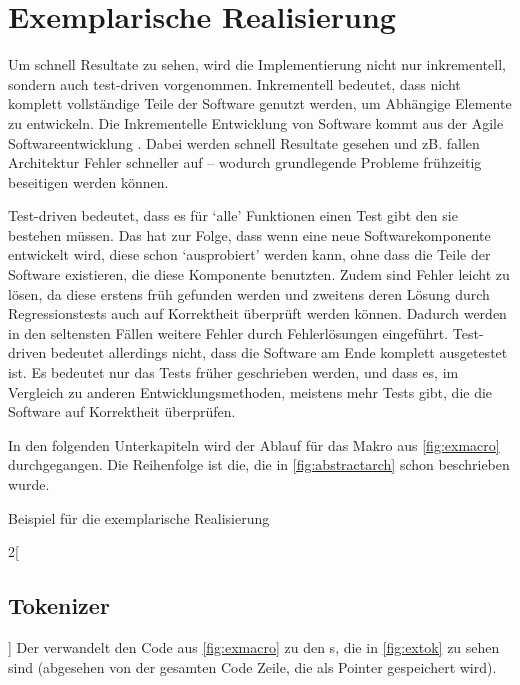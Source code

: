 {%
\section{Exemplarische Realisierung}
\label{sec:Exemplarische Realisierung}
  Um schnell Resultate zu sehen, wird die Implementierung nicht nur inkrementell, sondern auch test-driven \autocite{beck2003test} vorgenommen. Inkrementell bedeutet, dass nicht komplett vollständige Teile der Software genutzt werden, um Abhängige Elemente zu entwickeln. Die Inkrementelle Entwicklung von Software kommt aus der Agile Softwareentwicklung \autocite{cohen2003agile}. Dabei werden schnell Resultate gesehen und zB. fallen Architektur Fehler schneller auf -- wodurch grundlegende Probleme frühzeitig beseitigen werden können.

  Test-driven bedeutet, dass es für `alle' Funktionen einen Test gibt den sie bestehen müssen. Das hat zur Folge, dass wenn eine neue Softwarekomponente entwickelt wird, diese schon `ausprobiert' werden kann, ohne dass die Teile der Software existieren, die diese Komponente benutzten. Zudem sind Fehler leicht zu lösen, da diese erstens früh gefunden werden und zweitens deren Lösung durch Regressionstests auch auf Korrektheit überprüft werden können. Dadurch werden in den seltensten Fällen weitere Fehler durch Fehlerlösungen eingeführt. Test-driven bedeutet allerdings nicht, dass die Software am Ende komplett ausgetestet ist. Es bedeutet nur das Tests früher geschrieben werden, und dass es, im Vergleich zu anderen Entwicklungsmethoden, meistens mehr Tests gibt, die die Software auf Korrektheit überprüfen.

  In den folgenden Unterkapiteln wird der Ablauf für das Makro aus \autoref{fig:exmacro} durchgegangen. Die Reihenfolge ist die, die in \autoref{fig:abstractarch} schon beschrieben wurde.
  \begin{myCodeEnv}
    \centering
    \begin{myInvBox}[width=.9\linewidth]
      
    \end{myInvBox}
    \caption{Beispiel für die exemplarische Realisierung}
    \label{fig:exmacro}
  \end{myCodeEnv}

  \begin{paracol}{2}[\subsection{Tokenizer}]
    \label{ssec:Tokenizer}
      Der  verwandelt den Code aus \autoref{fig:exmacro} zu den s, die in \autoref{fig:extok} zu sehen sind (abgesehen von der gesamten Code Zeile, die als Pointer gespeichert wird).


\end{paracol}}
